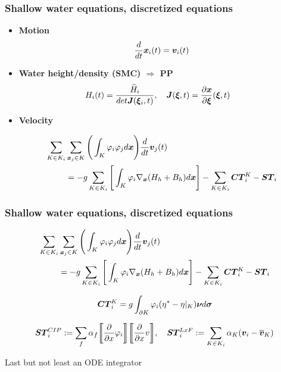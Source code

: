 \documentclass[pt12]{beamer}
\newcommand{\uvec}[2][3]{\boldsymbol{#2\mkern-#1mu}\mkern#1mu}
\begin{document}
\begin{frame}
\frametitle{Shallow water equations, discretized equations}

\begin{itemize}

\item \textbf{Motion}
$$\frac{d}{dt}\uvec{x}_i(t)=\uvec{v}_i(t)$$

\item \textbf{Water height/density (SMC) $\Rightarrow$ PP} 
\begin{align*}
&H_i(t)=\frac{\widehat{H}_i}{det \uvec{J}(\uvec{\xi}_i,t)}, \quad \uvec{J}(\uvec{\xi},t)=\frac{\partial \uvec{x}}{\partial \uvec{\xi}}(\uvec{\xi},t)
\end{align*}


\item \textbf{Velocity} 

\begin{align*}
\sum_{K \in K_i} & \sum_{\uvec{x}_j \in K} \Bigg(\int_K \varphi_i \varphi_j d \uvec{x}\Bigg) \frac{d}{dt}\uvec{v}_j(t)\\
&= -g \sum_{K \in K_i} \Bigg[ \int_K \varphi_i \nabla_{\uvec{x}}(H_h+B_h)  d\uvec{x}\Bigg] - \sum_{K \in K_i} \uvec{CT}_i^K -\uvec{ST}_i
\end{align*}

\end{itemize}


\end{frame}


\begin{frame}
\frametitle{Shallow water equations, discretized equations}


\begin{align*}
\sum_{K \in K_i} & \sum_{\uvec{x}_j \in K} \Bigg(\int_K \varphi_i \varphi_j d \uvec{x}\Bigg) \frac{d}{dt}\uvec{v}_j(t)\\
&= -g \sum_{K \in K_i} \Bigg[ \int_K \varphi_i \nabla_{\uvec{x}}(H_h+B_h)  d\uvec{x}\Bigg] - \sum_{K \in K_i} \uvec{CT}_i^K -\uvec{ST}_i
\end{align*}

\begin{align*}
\uvec{CT}_i^K=g\int_{\partial K} \varphi_i (\eta^*-\eta\vert_K) \uvec{\nu} d \uvec{\sigma}
\end{align*}



\begin{align*}
\uvec{ST}^{CIP}_i:=\sum_{f}\alpha_f  \biggl\llbracket \frac{\partial}{\partial x} \varphi_i\biggr\rrbracket  \biggl\llbracket \frac{\partial}{\partial x} v \biggr\rrbracket, \quad \uvec{ST}^{LxF}_i:= \sum_{K \in K_i} \alpha_K (\uvec{v}_i-\overline{\uvec{v}}_K)
\end{align*}

\centering

Last but not least an ODE integrator

\end{frame}
\end{document}
